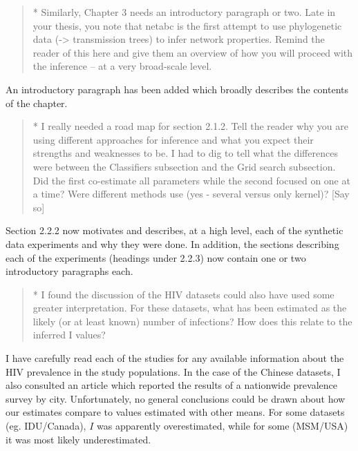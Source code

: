 \documentclass[12pt]{article}
\begin{document}
\begin{quote}
  \itshape

  * Similarly, Chapter 3 needs an introductory paragraph or two.  Late in your
  thesis, you note that netabc is the first attempt to use phylogenetic data
  (-> transmission trees) to infer network properties.  Remind the reader of
  this here and give them an overview of how you will proceed with the
  inference -- at a very broad-scale level.
\end{quote}

An introductory paragraph has been added which broadly describes the contents
of the chapter.

\begin{quote}
  \itshape
  
  * I really needed a road map for section 2.1.2.  Tell the reader why you are
  using different approaches for inference and what you expect their strengths
  and weaknesses to be.  I had to dig to tell what the differences were between
  the Classifiers subsection and the Grid search subsection.  Did the first
  co-estimate all parameters while the second focused on one at a time?  Were
  different methods use (yes - several versus only kernel)?  [Say so]
\end{quote}

Section 2.2.2 now motivates and describes, at a high level, each of the
synthetic data experiments and why they were done. In addition, the sections
describing each of the experiments (headings under 2.2.3) now contain one or
two introductory paragraphs each.

\begin{quote}
  \itshape

  * I found the discussion of the HIV datasets could also have used some
  greater interpretation.  For these datasets, what has been estimated as the
  likely (or at least known) number of infections?  How does this relate to the
  inferred I values?
\end{quote}

I have carefully read each of the studies for any available information about
the HIV prevalence in the study populations. In the case of the Chinese
datasets, I also consulted an article which reported the results of a
nationwide prevalence survey by city. Unfortunately, no general conclusions
could be drawn about how our estimates compare to values estimated with other
means. For some datasets (eg. IDU/Canada), $I$ was apparently overestimated,
while for some (MSM/USA) it was most likely underestimated.
\end{document}
